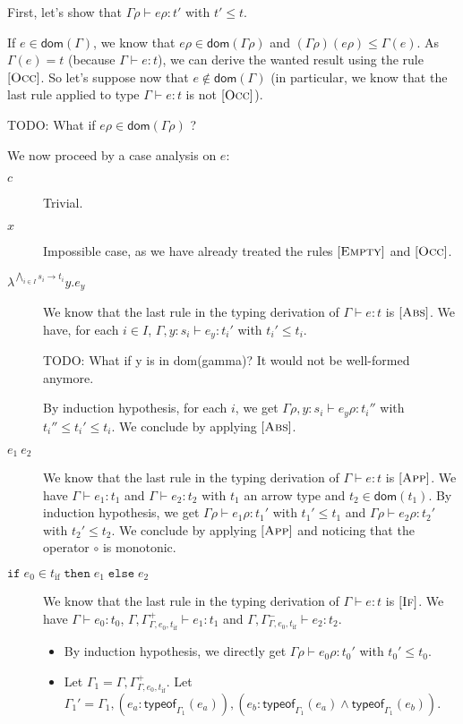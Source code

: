 \documentclass[a4paper]{article}%
\newcommand{\dom}[1]{\textsf{dom}(#1)}
\newcommand{\alt}{~|~}
\newcommand{\ite}[4]{\ensuremath{\texttt{if}\;#1\in#2\;\texttt{then}\;#3\;\texttt{else}\;#4}}
\newcommand{\tyof}[2]{\textsf{typeof}_{#2}(#1)}
\theoremstyle{definition}
\newcommand {\Rule}[1] {[\textsc{#1}]}
\begin{document}
        First, let's show that $\Gamma \rho \vdash e \rho:t'$ with $t'\leq t$.
    
        If $e\in\dom\Gamma$, we know that $e\rho\in\dom{\Gamma\rho}$ and $(\Gamma\rho)(e\rho) \leq \Gamma(e)$.
        As $\Gamma(e) = t$ (because $\Gamma \vdash e:t$), we can derive the wanted result using the rule $\Rule {Occ}$.
        So let's suppose now that $e\not\in\dom\Gamma$ (in particular, we know that the last rule applied to type $\Gamma \vdash e:t$ is not $\Rule{Occ}$).
        
        TODO: What if $e\rho\in\dom{\Gamma\rho}$ ? 

        We now proceed by a case analysis on $e$:
        
        \begin{description}
          \item[$c$] Trivial.
          \item[$x$] Impossible case, as we have already treated the rules $\Rule{Empty}$ and $\Rule{Occ}$.
          \item[$\lambda^{\bigwedge_{i\in I} s_i \rightarrow t_i}y.e_y$]
          We know that the last rule in the typing derivation of $\Gamma \vdash e:t$ is $\Rule {Abs}$.
          We have, for each $i \in I$, $\Gamma,y:s_i \vdash e_y:t_i'$ with $t_i'\leq t_i$.
          
          TODO: What if y is in dom(gamma)? It would not be well-formed anymore.

          By induction hypothesis, for each $i$, we get  $\Gamma\rho,y:s_i \vdash e_y\rho:t_i''$ with $t_i''\leq t_i'\leq t_i$. We conclude by applying $\Rule {Abs}$.
          \item[$e_1\ e_2$] We know that the last rule in the typing derivation of $\Gamma \vdash e:t$ is $\Rule {App}$.
          We have $\Gamma\vdash e_1:t_1$ and $\Gamma\vdash e_2:t_2$ with $t_1$ an arrow type and $t_2 \in \dom {t_1}$.
          By induction hypothesis, we get $\Gamma\rho\vdash e_1\rho:t_1'$ with $t_1' \leq t_1$ and $\Gamma\rho\vdash e_2\rho:t_2'$ with $t_2' \leq t_2$.
          We conclude by applying $\Rule {App}$ and noticing that the operator $\circ$ is monotonic.
          \item[$\ite {e_0} {t_{\text{if}}} {e_1}{e_2}$] We know that the last rule in the typing derivation of $\Gamma \vdash e:t$ is $\Rule {If}$.
          We have $\Gamma\vdash e_0:t_0$, $\Gamma,\Gamma^+_{\Gamma,e_0,t_{\text{if}}}\vdash e_1 : t_1$ and $\Gamma,\Gamma^-_{\Gamma,e_0,t_{\text{if}}}\vdash e_2 : t_2$.
          \begin{itemize}
            \item By induction hypothesis, we directly get $\Gamma\rho\vdash e_0\rho:t_0'$ with $t_0'\leq t_0$.
            \item Let $\Gamma_1 = \Gamma,\Gamma^+_{\Gamma,e_0,t_{\text{if}}}$.
            Let $\Gamma_1'=\Gamma_1,(e_a:\tyof {e_a} {\Gamma_1}), (e_b:\tyof {e_a} {\Gamma_1}\land\tyof {e_b} {\Gamma_1}
            )$.
            

\end{itemize}
\end{description}
\end{document}
